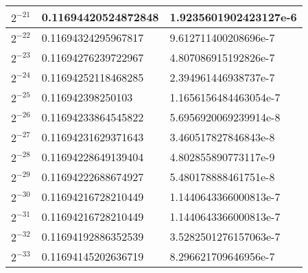 \documentclass[11pt]{article}
\begin{document}
\begin{tabularx}{\textwidth}{|l|X|X|}
\hline
$2^{-21}$ & 0.11694420524872848 & 1.9235601902423127e-6 \\
\hline
$2^{-22}$ & 0.11694324295967817 & 9.612711400208696e-7 \\
\hline
$2^{-23}$ & 0.11694276239722967 & 4.807086915192826e-7 \\
\hline
$2^{-24}$ & 0.11694252118468285 & 2.394961446938737e-7 \\
\hline
$2^{-25}$ & 0.116942398250103 & 1.1656156484463054e-7 \\
\hline
$2^{-26}$ & 0.11694233864545822 & 5.6956920069239914e-8 \\
\hline
$2^{-27}$ & 0.11694231629371643 & 3.460517827846843e-8 \\
\hline
$2^{-28}$ & 0.11694228649139404 & 4.802855890773117e-9 \\
\hline
$2^{-29}$ & 0.11694222688674927 & 5.480178888461751e-8 \\
\hline
$2^{-30}$ & 0.11694216728210449 & 1.1440643366000813e-7 \\
\hline
$2^{-31}$ & 0.11694216728210449 & 1.1440643366000813e-7 \\
\hline
$2^{-32}$ & 0.11694192886352539 & 3.5282501276157063e-7 \\
\hline
$2^{-33}$ & 0.11694145202636719 & 8.296621709646956e-7 \\
\hline
\end{tabularx}
\vspace{25pt} \\
\setlength{\tabcolsep}{2pt}
\renewcommand{\arraystretch}{1.3}
\end{document}
